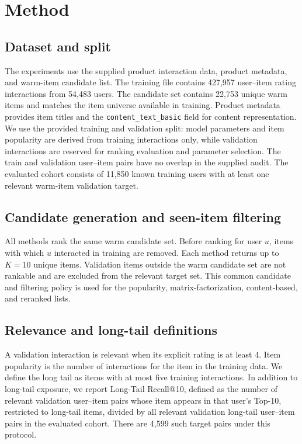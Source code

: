 \section{Method}
\label{sec:method}

\subsection{Dataset and split}
The experiments use the supplied product interaction data, product metadata, and warm-item candidate list. The training file contains 427{,}957 user--item rating interactions from 54{,}483 users. The candidate set contains 22{,}753 unique warm items and matches the item universe available in training. Product metadata provides item titles and the \texttt{content\_text\_basic} field for content representation. We use the provided training and validation split: model parameters and item popularity are derived from training interactions only, while validation interactions are reserved for ranking evaluation and parameter selection. The train and validation user--item pairs have no overlap in the supplied audit. The evaluated cohort consists of 11{,}850 known training users with at least one relevant warm-item validation target.

\subsection{Candidate generation and seen-item filtering}
All methods rank the same warm candidate set. Before ranking for user $u$, items with which $u$ interacted in training are removed. Each method returns up to $K=10$ unique items. Validation items outside the warm candidate set are not rankable and are excluded from the relevant target set. This common candidate and filtering policy is used for the popularity, matrix-factorization, content-based, and reranked lists.

\subsection{Relevance and long-tail definitions}
A validation interaction is relevant when its explicit rating is at least 4. Item popularity is the number of interactions for the item in the training data. We define the long tail as items with at most five training interactions. In addition to long-tail exposure, we report Long-Tail Recall@10, defined as the number of relevant validation user--item pairs whose item appears in that user's Top-10, restricted to long-tail items, divided by all relevant validation long-tail user--item pairs in the evaluated cohort. There are 4{,}599 such target pairs under this protocol.

